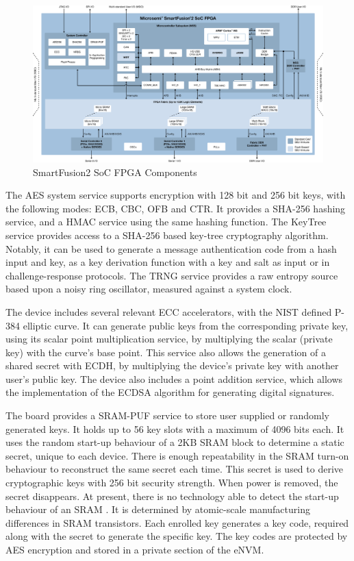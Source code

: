 \begin{figure}[h!]
    \centering
    \includegraphics[width=1\textwidth]{./Images/Microsemi_Smartfusion2_BD.png}
    \caption{SmartFusion2 SoC FPGA Components}
    \label{fig:smartfusion2}
\end{figure}

The \ac{AES} system service supports encryption with 128 bit and 256 bit keys, with the following modes: ECB, CBC, OFB and CTR.
It provides a \ac{SHA}-256 hashing service, and a \ac{HMAC} service using the same hashing function.
The KeyTree service provides access to a SHA-256 based key-tree cryptography algorithm. Notably, it can be used to generate a message authentication code from a hash input and key, as a key derivation function with a key and salt as input or in challenge-response protocols.
The \ac{TRNG} service provides a raw entropy source based upon a noisy ring oscillator, measured against a system clock.

The device includes several relevant \ac{ECC} accelerators, with the \ac{NIST} defined P-384 elliptic curve.
It can generate public keys from the corresponding private key, using its scalar point multiplication service, by multiplying the scalar (private key) with the curve's base point. This service also allows the generation of a shared secret with \ac{ECDH}, by multiplying the device's private key with another user's public key.
The device also includes a point addition service, which allows the implementation of the \ac{ECDSA} algorithm for generating digital signatures.

The board provides a SRAM-PUF service to store user supplied or randomly generated keys.  It holds up to 56 key slots with a maximum of 4096 bits each.
It uses the random start-up behaviour of a 2KB \ac{SRAM} block to determine a static secret, unique to each device. There is enough repeatability in the SRAM turn-on behaviour to reconstruct the same secret each time. This secret is used to derive cryptographic keys with 256 bit security strength.
When power is removed, the secret disappears. At present, there is no technology able to detect the start-up behaviour of an SRAM \cite{smartfusionSecurityPractices}. It is determined by atomic-scale manufacturing differences in SRAM transistors.
Each enrolled key generates a key code, required along with the secret to generate the specific key.
The key codes are protected by \ac{AES} encryption and stored in a private section of the eNVM.

